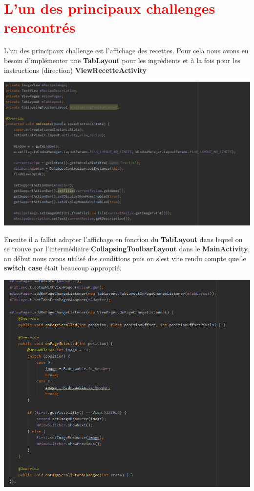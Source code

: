 \documentclass{article}
\begin{document}

\section{\textcolor{red}{L'un des principaux challenges rencontrés}}

L'un des principaux challenge est l'affichage des recettes. Pour cela nous avons eu besoin d'implémenter une \textbf{TabLayout} pour les ingrédients et à la fois pour les instructions (direction)  \textbf{ViewRecetteActivity}

\begin{center}
    \includegraphics[scale=0.7]{viewrecetteacti.png} 
\end{center}

Ensuite il a fallut adapter l'affichage en fonction du \textbf{TabLayout} dans lequel on se trouve par l'intermédiaire \textbf{CollapsingToolbarLayout} dans le \textbf{MainActivity}, au début nous avons utilisé des conditions puis on s'est vite rendu compte que le \textbf{switch case} était beaucoup approprié. 

\newpage

\begin{center}
    \includegraphics[scale=0.7]{mainacti.png} 
\end{center}
\end{document}
